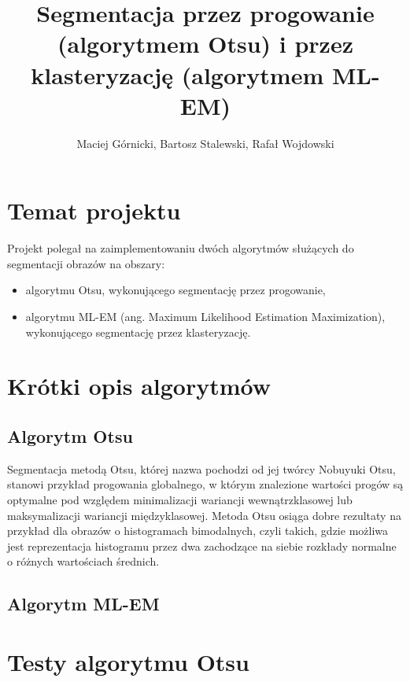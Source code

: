 \documentclass[10pt]{llncs}
\begin{document}
	
\title{Segmentacja przez progowanie (algorytmem Otsu) i przez klasteryzację (algorytmem ML-EM)}
\author{Maciej Górnicki, Bartosz Stalewski, Rafał Wojdowski}
\maketitle

\section{Temat projektu}

Projekt polegał na zaimplementowaniu dwóch algorytmów służących do segmentacji obrazów na obszary:
\begin{itemize}
	\item algorytmu Otsu, wykonującego segmentację przez progowanie,
	\item algorytmu ML-EM (ang. Maximum Likelihood Estimation Maximization), wykonującego segmentację przez klasteryzację. 
\end{itemize}

\section{Krótki opis algorytmów}

\subsection{Algorytm Otsu}

Segmentacja metodą Otsu, której nazwa pochodzi od jej twórcy Nobuyuki Otsu, stanowi przykład progowania globalnego, w którym znalezione wartości progów są optymalne pod względem minimalizacji wariancji wewnątrzklasowej lub maksymalizacji wariancji międzyklasowej. Metoda Otsu osiąga dobre rezultaty na przykład dla obrazów o histogramach bimodalnych, czyli takich, gdzie możliwa jest reprezentacja histogramu przez dwa zachodzące na siebie rozkłady normalne o różnych wartościach średnich.

\subsection{Algorytm ML-EM}

\section{Testy algorytmu Otsu}
\end{document}
